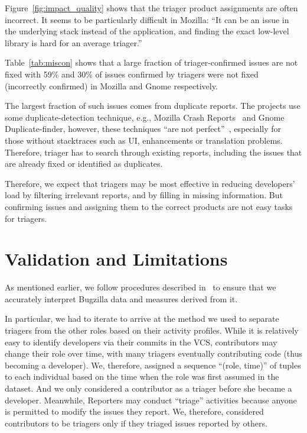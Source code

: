 \documentclass[conference]{IEEEtran}
\begin{document}
Figure~\ref{fig:impact_quality} shows that the triager product
assignments are often incorrect. It seems to be particularly
difficult in Mozilla: ``It can be an issue in the underlying stack instead
of the application, and finding the exact low-level library is hard for an
average triager.''


Table~\ref{tab:miscon} shows that
a large fraction of triager-confirmed issues are not fixed with
59\% and 30\% of issues confirmed by triagers were not fixed
(incorrectly confirmed) in Mozilla and Gnome respectively.


The largest fraction of such issues comes from duplicate reports.
The projects use some duplicate-detection technique, e.g., Mozilla
Crash Reports~\cite{mzcrep} and
Gnome Duplicate-finder, however, these techniques ``are not
perfect''~\cite{gntriage},
especially for those without stacktraces such as UI, enhancements or
translation problems.  Therefore, triager has to search through
existing reports, including the issues that are already fixed or
identified as duplicates.

Therefore, we expect that triagers may be most effective in reducing
developers' load by filtering irrelevant reports, and by filling in
missing information. But confirming issues and assigning them to the
correct products are not easy tasks for triagers.

\section{Validation and Limitations}\label{s:validation}
As mentioned earlier, we follow procedures described in~\cite{Changes07}
to ensure that we accurately interpret Bugzilla data and measures
derived from it.

In particular, we had to iterate to arrive at the method
we used to separate triagers from the other roles based on their
activity profiles. While it is relatively easy to identify developers
via their commits in the VCS, contributors may change their role
over time, with many triagers eventually contributing code (thus
becoming a developer). We, therefore, assigned a sequence ``(role,
time)'' of tuples to each individual based on the time when the role
was first assumed in the dataset. And we only considered a
contributor as a triager before she became a developer.  Meanwhile,
Reporters may conduct ``triage'' activities because anyone is
permitted to modify the issues they report.  We, therefore,
considered contributors to be triagers only if they triaged issues
reported by others.
\end{document}
